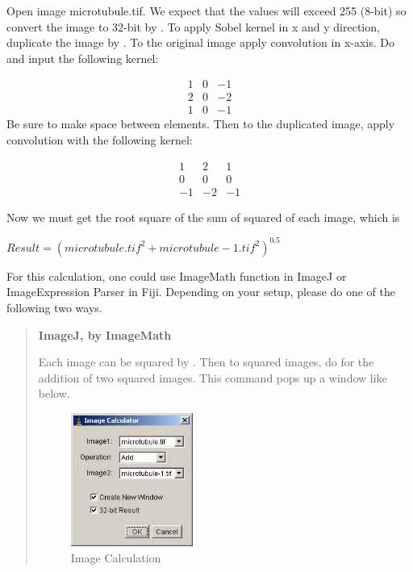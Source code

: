 \begin{indentexercise}{1}
Open image microtubule.tif. We expect that the values will exceed 255 (8-bit) so convert the image to
32-bit by . To apply Sobel kernel in x and y direction, duplicate the image by . 
To the original image apply convolution in x-axis. 
Do  and input the following kernel:

\[
 \begin{matrix}
  1 & 0 & -1 \\
  2 & 0 & -2 \\
  1 & 0 & -1
 \end{matrix}
\]
Be sure to make space between elements. Then to the duplicated image,
apply convolution with the following kernel:

\[
 \begin{matrix}
  1 & 2 & 1 \\
  0 & 0 & 0 \\
  -1 & -2 & -1
 \end{matrix}
\]

Now we must get the root square of the sum of squared of each image,
which is

$Result =(microtubule.tif^{2}+ microtubule-1.tif^{2})^{0.5}$

For this calculation, one could use ImageMath function in ImageJ or ImageExpression Parser in Fiji. Depending on your setup, please do one of the following two ways. 

\begin{quote}
\textbf{ImageJ, by ImageMath}

Each image can be squared by . 
Then to squared images, do  for the addition of two squared images. This command pops up a window like below. 

\begin{figure}[htbp]
\begin{center}
\includegraphics[width=4cm]{fig/CMCIBasicCourse201102-img110.jpg}
\caption{ Image Calculation}
\label{fig:ImageCalculatorDialog}
\end{center}
\end{figure}


\end{quote}
\end{indentexercise}
